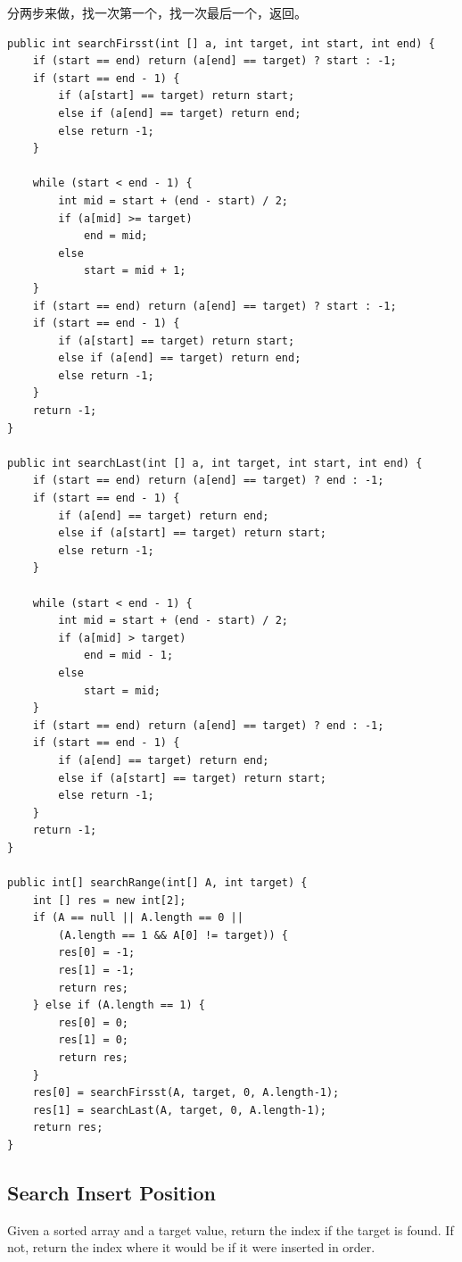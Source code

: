 \documentclass[12pt]{book}
\begin{document}
分两步来做，找一次第一个，找一次最后一个，返回。
\lstset{language=java,label= ,caption= ,numbers=none}
\begin{lstlisting}
public int searchFirsst(int [] a, int target, int start, int end) {
    if (start == end) return (a[end] == target) ? start : -1;
    if (start == end - 1) {
        if (a[start] == target) return start;
        else if (a[end] == target) return end;
        else return -1;
    }

    while (start < end - 1) {
        int mid = start + (end - start) / 2;
        if (a[mid] >= target) 
            end = mid;
        else 
            start = mid + 1;
    }
    if (start == end) return (a[end] == target) ? start : -1;
    if (start == end - 1) {
        if (a[start] == target) return start;
        else if (a[end] == target) return end;
        else return -1;
    }
    return -1;
}
        
public int searchLast(int [] a, int target, int start, int end) {
    if (start == end) return (a[end] == target) ? end : -1;
    if (start == end - 1) {
        if (a[end] == target) return end;        
        else if (a[start] == target) return start;
        else return -1;
    }

    while (start < end - 1) {
        int mid = start + (end - start) / 2;
        if (a[mid] > target) 
            end = mid - 1;
        else 
            start = mid;
    }
    if (start == end) return (a[end] == target) ? end : -1;
    if (start == end - 1) {
        if (a[end] == target) return end;        
        else if (a[start] == target) return start;
        else return -1;
    }
    return -1;
}

public int[] searchRange(int[] A, int target) {
    int [] res = new int[2];
    if (A == null || A.length == 0 ||
        (A.length == 1 && A[0] != target)) {
        res[0] = -1;
        res[1] = -1;
        return res;   
    } else if (A.length == 1) {
        res[0] = 0;
        res[1] = 0;
        return res;   
    }
    res[0] = searchFirsst(A, target, 0, A.length-1);
    res[1] = searchLast(A, target, 0, A.length-1);
    return res;
}
\end{lstlisting}

\subsection{Search Insert Position}
\label{sec-8-1-2}
Given a sorted array and a target value, return the index if the target is found. If not, return the index where it would be if it were inserted in order.
\end{document}
